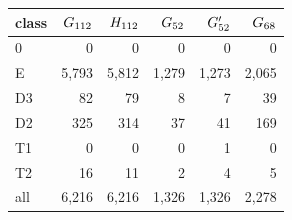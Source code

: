 \begin{tabular}{lrrrrr}
\toprule
class & $G_{112}$ & $H_{112}$ & $G_{52}$ & $G'_{52}$ & $G_{68}$\\
\midrule
0 & 0 & 0 & 0 & 0 & 0\\
E & 5{,}793 & 5{,}812 & 1{,}279 & 1{,}273 & 2{,}065\\
D3 & 82 & 79 & 8 & 7 & 39\\
D2 & 325 & 314 & 37 & 41 & 169\\
T1 & 0 & 0 & 0 & 1 & 0\\
T2 & 16 & 11 & 2 & 4 & 5\\
all & 6{,}216 & 6{,}216 & 1{,}326 & 1{,}326 & 2{,}278\\
\bottomrule
\end{tabular}
